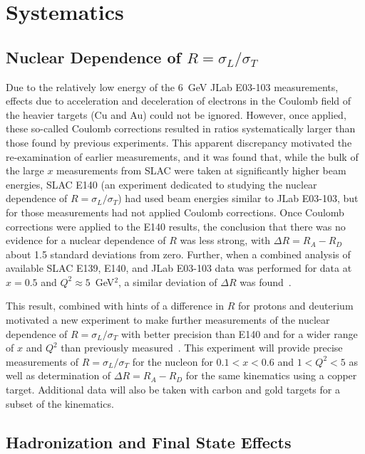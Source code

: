 \section{Systematics}
\subsection{Nuclear Dependence of $R=\sigma_L/\sigma_T$}


Due to the relatively low energy of the 6~GeV JLab E03-103 measurements, effects due to acceleration and
deceleration of electrons in the Coulomb field of the heavier targets (Cu and Au) could not be ignored.
However, once applied, these so-called Coulomb corrections resulted in ratios systematically larger
than those found by previous experiments.  This apparent discrepancy motivated the re-examination of
earlier measurements, and it was found that, while the bulk of the large $x$ measurements from SLAC
were taken at significantly higher beam energies, SLAC E140 (an experiment dedicated to studying
the nuclear dependence of $R=\sigma_L/\sigma_T$) had used beam energies similar to JLab E03-103, but for
those measurements had not applied Coulomb corrections.  Once Coulomb corrections were applied to the E140
results, the conclusion that there was no evidence for a nuclear dependence of $R$ was less strong, with
$\Delta R=R_A-R_D$ about 1.5 standard deviations from zero. Further, when a combined analysis
of available SLAC E139, E140, and JLab E03-103 data was performed for data at $x=0.5$ and $Q^2\approx5$~GeV$^2$,
a similar deviation of $\Delta R$ was found~\cite{Solvignon:2009it}.

This result, combined with hints of a difference in $R$ for protons and deuterium motivated a 
new experiment to make further measurements of the nuclear dependence of $R=\sigma_L/\sigma_T$
with better precision than E140 and for a wider range of $x$ and $Q^2$ than previously
measured~\cite{12gev_nucr}.  This experiment will provide precise measurements of $R=\sigma_L/\sigma_T$
for the nucleon for $0.1<x<0.6$ and $1<Q^2<5$ as well as determination of $\Delta R= R_A-R_D$ for the same
kinematics using a copper target. Additional data will also be taken with carbon and gold targets for a subset
of the kinematics.


\subsection{Hadronization and Final State Effects}

